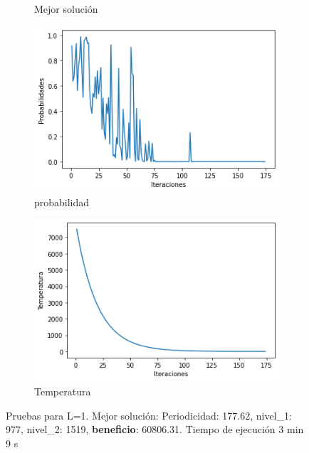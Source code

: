 \documentclass[a4paper,12pt]{article}
\begin{document}
\begin{figure}[H]
\begin{subfigure}{0.24\textwidth}
			\caption{Mejor solución}
		\end{subfigure}
		\hfill
		\begin{subfigure}{0.24\textwidth}
			\centering
			\includegraphics[width=\textwidth]{include/L1/probabilidades.png}
			\caption{probabilidad}
		\end{subfigure}
		\hfill
		\begin{subfigure}{0.24\textwidth}
			\centering
			\includegraphics[width=\textwidth]{include/L1/temperatura.png}
			\caption{Temperatura}
		\end{subfigure}
		\caption{Pruebas para L=1. Mejor solución: Periodicidad: 177.62, nivel\_1: 977, nivel\_2: 1519, \textbf{beneficio}: 60806.31. Tiempo de ejecución 3 min 9 s }
	\end{figure}
\end{document}
